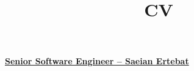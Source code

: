
\usepackage{lipsum} %
\usepackage{multicol}
\usepackage{graphicx}
\usepackage[scale=0.8]{geometry}%
\usepackage{fontawesome}

\newcommand*{\authorimg}[1]{%
	\raisebox{-.3\baselineskip}{%
		\texttt{[image: \#1]}%
	}%
}

\title{CV}

\address{\textbf{\href{https://sbu.ac.ir/Cols/CSE/Pages/default.aspx/}{University of Shahid Beheshti -- Department of Computer Science}{}}}{\textbf{\href{http://www.senatelecom.com/}{Senior Software Engineer -- Saeian Ertebat}{}}}{}





